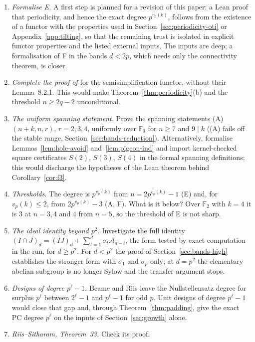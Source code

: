 \begin{enumerate}
\item \emph{Formalise E.}  A first step is planned for a revision of this paper: a Lean proof that
  periodicity, and hence the exact degree $p^{v_p(k)}$, follows from the existence of a functor
  with the properties used in Section~\ref{sec:periodicity-oti} or Appendix~\ref{app:tilting}, so that the remaining trust is
  isolated in explicit functor properties and the listed external inputs.  The inputs are deep; a formalisation of F in
  the bands $d<2p$, which needs only the connectivity theorem, is closer.
\item \emph{Complete the proof of \cite[Thm.~8.4.5]{hone2025}} for the semisimplification
  functor, without their Lemma~8.2.1.  This would make Theorem~\ref{thm:periodicity}(b) and
  the threshold $n\ge2q-2$ unconditional.
\item \emph{The uniform spanning statement.}  Prove the spanning statements
  (A)$(n+k,n,r)$, $r=2,3,4$, uniformly over $\mathbb F_3$ for $n\ge7$ and $9\mid k$ ((A) fails
  off the stable range, Section~\ref{sec:bands-reduction}).  Alternatively, formalise
  Lemmas~\ref{lem:hole-avoid} and~\ref{lem:pigeon-ind} and import kernel-checked square
  certificates $S(2)$, $S(3)$, $S(4)$ in the formal spanning definitions; this would discharge
  the hypotheses of the Lean theorem behind Corollary~\ref{cor:f3}.
\item \emph{Thresholds.}  The degree is $p^{v_p(k)}$ from $n=2p^{v_p(k)}-1$ (E) and, for
  $v_p(k)\le2$, from $2p^{v_p(k)}-3$ (A, F).  What is it below?  Over $\mathbb F_2$ with $k=4$
  it is $3$ at $n=3,4$ and $4$ from $n=5$, so the threshold of E is not sharp.
\item \emph{The ideal identity beyond $p^2$.}  Investigate the full identity
  $(I\cap J)_d=(IJ)_d+\sum_{t=1}^d\sigma_t\mathcal A_{d-t}$, the form tested by exact
  computation in the run, for $d\ge p^2$.  For $d<p^2$ the proof of
  Section~\ref{sec:bands-high} establishes the stronger form with $\sigma_1$ and $\sigma_p$
  only; at $d=p^2$ the elementary abelian subgroup is no longer Sylow and the transfer
  argument stops.
\item \emph{Designs of degree $p^\ell-1$.}  Beame and Riis leave the Nullstellensatz degree for
  surplus $p^\ell$ between $2^\ell-1$ and $p^\ell-1$ for odd $p$.  Unit designs of degree
  $p^\ell-1$ would close that gap and, through Theorem~\ref{thm:padding}, give the exact PC
  degree $p^\ell$ on the inputs of Section~\ref{sec:growth} alone.
\item \emph{Riis--Sitharam, Theorem~33.}  Check its proof.
\end{enumerate}
